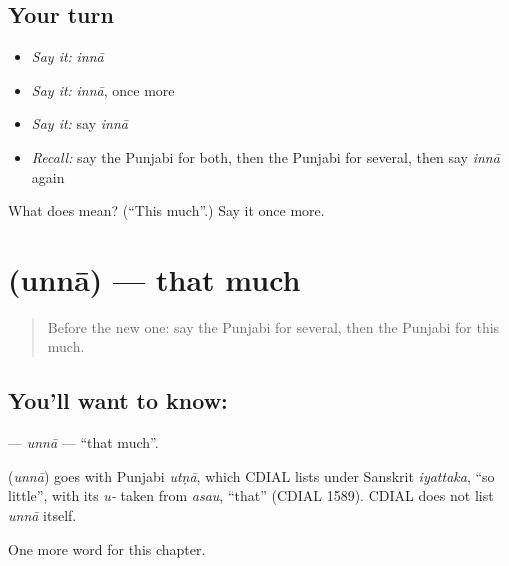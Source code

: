 \subsection*{Your turn}
\begin{itemize}
\raggedright
  \item \emph{Say it:} \emph{innā}
  \item \emph{Say it:} \emph{innā}, once more
  \item \emph{Say it:} say \emph{innā}
  \item \emph{Recall:} say the Punjabi for both, then the Punjabi for several, then say \emph{innā} again
\end{itemize}

\begin{tcolorbox}[breakable,colback=teal!4,colframe=teal!35!black,title={Before you move on}]
What does  mean? (\textquotedblleft{}This much\textquotedblright{}.) Say it once more.
\end{tcolorbox}
\section[\texorpdfstring{\pa{ਉੰਨਾ} (unnā)}{ਉੰਨਾ (unnā)}]{ (unnā) — that much}

\label{lesson:PA-C108-unna}



\begin{quote}
Before the new one: say the Punjabi for several, then the Punjabi for this much.
\end{quote}

\subsection*{You'll want to know: }
\textbf{} — \emph{unnā} — \textquotedblleft{}that much\textquotedblright{}.

\begin{cousinweb}
\textbf{} (\emph{unnā}) goes with Punjabi \emph{utṇā}, which CDIAL lists under Sanskrit \emph{iyattaka}, \textquotedblleft{}so little\textquotedblright{}, with its \emph{u-} taken from \emph{asau}, \textquotedblleft{}that\textquotedblright{} (CDIAL 1589). CDIAL does not list \emph{unnā} itself.
\end{cousinweb}

\begin{grammarlens}[title={What you've built}]
One more word for this chapter.
\end{grammarlens}

